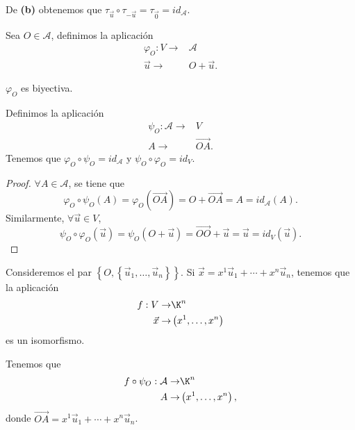 \begin{observation}
\normalfont De \textbf{(b)} obtenemos que $\displaystyle \tau_{\vec{u}}\circ\tau_{-\vec{u}} = \tau_{\vec{0}}= id _{\mathcal{A}} $.
\end{observation}
Sea $\displaystyle O \in \mathcal{A} $, definimos la aplicación
\[
\begin{split}
	\varphi_{O} : V \to & \mathcal{A} \\
	\vec{u} \to & O + \vec{u}.
\end{split}
\]
\begin{fprop}[]
\normalfont $\displaystyle \varphi_{O} $ es biyectiva.
\end{fprop}
\begin{observation}
\normalfont Definimos la aplicación  
\[
\begin{split}
	\displaystyle \psi_{O} : \mathcal{A} \to  & V \\
	A \to & \overrightarrow{OA}.
\end{split}
\]
Tenemos que $\displaystyle \varphi_{O}\circ\psi_{O} = id _{\mathcal{A}} $ y $\displaystyle \psi_{O}\circ\varphi_{O} = id _{V} $.
\end{observation}
\begin{proof}
$\displaystyle \forall A \in \mathcal{A} $, se tiene que 
\[\varphi_{O} \circ\psi_{O}\left(A\right) = \varphi_{O}\left(\overrightarrow{OA}\right) = O + \overrightarrow{OA} = A = id _{\mathcal{A}}\left(A\right) .\]
Similarmente, $\displaystyle \forall \vec{u} \in V $, 
\[\psi_{O}\circ\varphi_{O}\left(\vec{u}\right) =\psi_{O}\left(O + \vec{u}\right) = \overrightarrow{O O} + \vec{u} = \vec{u} = id _{V}\left(\vec{u}\right).\]
\end{proof}
Consideremos el par $\displaystyle \left\{ O, \left\{ \vec{u}_{1}, \ldots, \vec{u}_{n}\right\} \right\}  $. Si $\displaystyle \vec{x} = x^{1}\vec{u}_{1} + \cdots + x^{n}\vec{u}_{n} $, tenemos que la aplicación
\[
\begin{split}
 f : V \to & \K^{n} \\
 \vec{x} \to & \left(x^{1}, \ldots, x^{n}\right)
\end{split}
\]
es un isomorfismo. 
\begin{observation}
\normalfont Tenemos que 
\[
\begin{split}
	f\circ\psi_{O} : \mathcal{A} \to & \K^{n} \\
	A \to & \left(x^{1}, \ldots, x^{n}\right),
\end{split}
\]
donde $\displaystyle \overrightarrow{OA} = x^{1}\vec{u}_{1} + \cdots +x^{n}\vec{u}_{n}  $. 
\end{observation}
